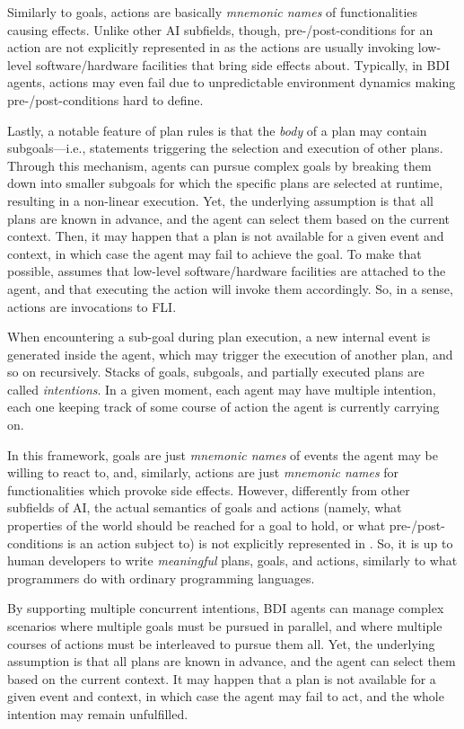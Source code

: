 \documentclass[12pt,a4paper,openright,twoside]{book}
\begin{document}
Similarly to goals, actions are basically \emph{mnemonic names} of functionalities causing effects.
%
Unlike other \ac{AI} subfields, though, pre-/post-conditions for an action are not explicitly represented in \agentspeak{} as the actions are usually invoking low-level software/hardware facilities that bring side effects about.
%
Typically, in \ac{BDI} agents, actions may even fail due to unpredictable environment dynamics making pre-/post-conditions hard to define.

Lastly, a notable feature of \agentspeak{} plan rules is that the \emph{body} of a plan may contain subgoals---i.e., statements triggering the selection and execution of other plans.
%
Through this mechanism, \agentspeak{} agents can pursue complex goals by breaking them down into smaller subgoals for which the specific plans are selected at runtime, resulting in a non-linear execution.
%
Yet, the underlying assumption is that all plans are known in advance, and the agent can select them based on the current context.
%
Then, it may happen that a plan is not available for a given event and context, in which case the agent may fail to achieve the goal.
%
To make that possible, \agentspeak{} assumes that low-level software/hardware facilities are attached to the agent, and that executing the action will invoke them accordingly.
%
So, in a sense, actions are invocations to \ac{FLI}.

When encountering a sub-goal during plan execution, a new internal event is generated inside the agent, which may trigger the execution of another plan, and so on recursively.
%
Stacks of goals, subgoals, and partially executed plans are called \emph{intentions}.
%
In a given moment, each agent may have multiple intention, each one keeping track of some course of action the agent is currently carrying on.

In this framework, goals are just \emph{mnemonic names} of events the agent may be willing to react to, and, similarly, actions are just \emph{mnemonic names} for functionalities which provoke side effects.
%
However, differently from other subfields of \ac{AI}, the actual semantics of goals and actions
(namely, what properties of the world should be reached for a goal to hold, or what pre-/post-conditions is an action subject to) is not explicitly represented in \agentspeak{}.
%
So, it is up to human developers to write \emph{meaningful} plans, goals, and actions, similarly to what programmers do with ordinary programming languages.

By supporting multiple concurrent intentions, \ac{BDI} agents can manage complex scenarios where multiple goals must be pursued in parallel, and where multiple courses of actions must be interleaved to pursue them all.
%
Yet, the underlying assumption is that all plans are known in advance, and the agent can select them based on the current context.
%
It may happen that a plan is not available for a given event and context, in which case the agent may fail to act, and the whole intention may remain unfulfilled.
\end{document}
